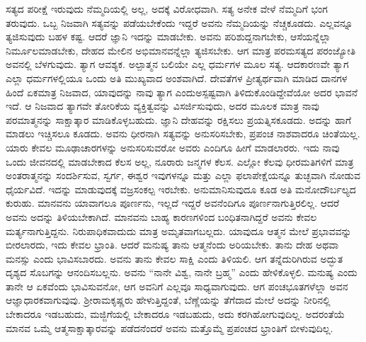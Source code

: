 ಸತ್ಯದ ಪರೀಕ್ಷೆ ಇರುವುದು ನೆಮ್ಮದಿಯಲ್ಲಿ ಅಲ್ಲ, ಅದಕ್ಕೆ ವಿರೋಧವಾಗಿ. ಸತ್ಯ ಅನೇಕ ವೇಳೆ ನೆಮ್ಮದಿಗೆ ಭಂಗ ತರುವುದು. ಒಬ್ಬ ನಿಜವಾಗಿ ಸತ್ಯವನ್ನು ಪಡೆಯಬೇಕೆಂದು ಇದ್ದರೆ ಅವನು ನೆಮ್ಮದಿಯನ್ನು ನೆಚ್ಚಕೂಡದು. ಎಲ್ಲವನ್ನೂ ತ್ಯಜಿಸುವುದು ಬಹಳ ಕಷ್ಟ. ಆದರೆ ಜ್ಞಾನಿ ಇದನ್ನು ಮಾಡಬೇಕು. ಅವನು ಪರಿಶುದ್ದನಾಗಬೇಕು, ಆಸೆಯನ್ನೆಲ್ಲಾ ನಿರ್ಮೂಲಮಾಡಬೇಕು, ದೇಹದ ಮೇಲಿನ ಅಭಿಮಾನವನ್ನೆಲ್ಲಾ ತ್ಯಜಿಸಬೇಕು. ಆಗ ಮಾತ್ರ ಪರಮಸತ್ಯದ ಪರಂಜ್ಯೋತಿ ಅವನಲ್ಲಿ ಬೆಳಗುವುದು. ತ್ಯಾಗ ಆವಶ್ಯಕ. ಅಲ್ಪಾತ್ಮನ ಬಲಿಯೇ ಎಲ್ಲ ಧರ್ಮಗಳ ಮೂಲ ಸತ್ಯ. ಆದಕಾರಣವೇ ತ್ಯಾಗ ಎಲ್ಲಾ ಧರ್ಮಗಳಲ್ಲಿಯೂ ಒಂದು ಅತಿ ಮುಖ್ಯವಾದ ಅಂಶವಾಗಿದೆ. ದೇವತೆಗಳ ಪ್ರೀತ್ಯರ್ಥವಾಗಿ ಮಾಡಿದ ದಾನಗಳ ಹಿಂದೆ ಏಕಮಾತ್ರ ನಿಜವಾದ, ಯಾವುದನ್ನು ನಾವು ತ್ಯಾಗ ಎಂದು\break ಅಸ್ಪಷ್ಟವಾಗಿ ತಿಳಿದುಕೊಂಡಿದ್ದೇವೆಯೋ ಅದರ ಭಾವನೆ ಇದೆ. ಆ ನಿಜವಾದ ತ್ಯಾಗವೇ ತೋರಿಕೆಯ ವ್ಯಕ್ತಿತ್ವವನ್ನು ವಿಸರ್ಜಿಸುವುದು, ಅದರ ಮೂಲಕ ಮಾತ್ರ ನಾವು ಪರಮಾತ್ಮನನ್ನು ಸಾಕ್ಷಾತ್ಕಾರ ಮಾಡಿಕೊಳ್ಳಬಹುದು. ಜ್ಞಾನಿ ದೇಹವನ್ನು ರಕ್ಷಿಸಲು ಪ್ರಯತ್ನಿಸಕೂಡದು. ಅದನ್ನು ಹಾಗೆ ಮಾಡಲು ಇಚ್ಚಿಸಲೂ ಕೂಡದು. ಅವನು ಧೀರನಾಗಿ ಸತ್ಯವನ್ನು ಅನುಸರಿಸಬೇಕು, ಪ್ರಪಂಚ ನಾಶವಾದರೂ ಚಿಂತೆಯಿಲ್ಲ. ಯಾರು ಕೇವಲ ಮೂಢಾಚಾರಗಳನ್ನು ಅನುಸರಿಸುವರೋ ಅವರು ಎಂದಿಗೂ ಹೀಗೆ ಮಾಡಲಾರರು. ಇದು ನಾವು ಒಂದು ಜೀವನದಲ್ಲಿ ಮಾಡಬೇಕಾದ ಕೆಲಸ ಅಲ್ಲ, ನೂರಾರು ಜನ್ಮಗಳ ಕೆಲಸ. ಎಲ್ಲೋ ಕೆಲವು ಧೀರಮತಿಗಳಿಗೆ ಮಾತ್ರ ಅಂತರಾತ್ಮನನ್ನು ಸಂದರ್ಶಿಸುವ, ಸ್ವರ್ಗ, ಈಶ್ವರ ಇವುಗಳನ್ನೂ ಮತ್ತು ಎಲ್ಲಾ ಫಲಾಪೇಕ್ಷೆಯನ್ನೂ ತುಚ್ಛವಾಗಿ ನೋಡುವ ಧೈರ್ಯವಿದೆ. ಇದನ್ನು ಮಾಡುವುದಕ್ಕೆ ವಜ್ರಸಂಕಲ್ಪ ಇರಬೇಕು. ಅನುಮಾನಿಸುವುದೂ ಕೂಡ ಅತಿ ಮನೋದೌರ್ಬಲ್ಯದ ಕುರುಹು. ಮಾನವನು ಯಾವಾಗಲೂ ಪೂರ್ಣನು, ಇಲ್ಲದೆ ಇದ್ದರೆ ಅವನೆಂದಿಗೂ ಪೂರ್ಣನಾಗುತ್ತಿರಲಿಲ್ಲ. ಆದರೆ ಅವನು ಅದನ್ನು ತಿಳಿಯಬೇಕಾಗಿದೆ. ಮಾನವನು ಬಾಹ್ಯ ಕಾರಣಗಳಿಂದ ಬಂಧಿತನಾಗಿದ್ದರೆ ಅವನು ಕೇವಲ ಮರ್ತ್ಯನಾಗುತ್ತಿದ್ದನು. ನಿರುಪಾಧಿಕವಾದುದು ಮಾತ್ರ ಅಮೃತವಾಗಬಲ್ಲದು. ಯಾವುದೂ ಆತ್ಮನ ಮೇಲೆ ಪ್ರಭಾವವನ್ನು ಬೀರಲಾರದು, ಇದು ಕೇವಲ ಭ್ರಾಂತಿ. ಆದರೆ ಮನುಷ್ಯ ತಾನು ಆತ್ಮನೆಂದು ಅರಿಯಬೇಕು. ತಾನು ದೇಹ ಅಥವಾ ಮನಸ್ಸು ಎಂದು ಭಾವಿಸಬಾರದು. ಅವನು ತಾನು ಕೇವಲ ಸಾಕ್ಷಿ ಎಂದು ತಿಳಿಯಲಿ. ಆಗ ತನ್ನೆದುರಿಗಿರುವ ಅದ್ಭುತ ದೃಶ್ಯದ ಸೊಬಗನ್ನು ಆನಂದಿಸಬಲ್ಲನು. ಅವನು “ನಾನೇ ವಿಶ್ವ, ನಾನೇ ಬ್ರಹ್ಮ'' ಎಂದು ಹೇಳಿಕೊಳ್ಳಲಿ. ಮನುಷ್ಯ ಎಂದು ತಾನೇ ಆ ಏಕವೆಂದು ಭಾವಿಸುವನೋ, ಆಗ ಅವನಿಗೆ ಎಲ್ಲವೂ ಸಾಧ್ಯವಾಗುವುದು. ಆಗ ಪಂಚಭೂತಗಳೆಲ್ಲಾ ಅವನ ಆಜ್ಞಾಧಾರಕವಾಗುವುವು. ಶ‍್ರೀರಾಮಕೃಷ್ಣರು ಹೇಳುತ್ತಿದ್ದಂತೆ, ಬೆಣ್ಣೆಯನ್ನು ತೆಗೆದಾದ ಮೇಲೆ ಅದನ್ನು ನೀರಿನಲ್ಲಿ ಬೇಕಾದರೂ ಇಡಬಹುದು, ಮಜ್ಜಿಗೆಯಲ್ಲಿ ಬೇಕಾದರೂ ಇಡಬಹುದು, ಅದು ಕರಗಿಹೋಗುವುದಿಲ್ಲ. ಅದರಂತೆಯೆ ಮಾನವ ಒಮ್ಮೆ ಆತ್ಮಸಾಕ್ಷಾತ್ಕಾರವನ್ನು ಪಡೆದನೆಂದರೆ ಅವನು ಮತ್ತೊಮ್ಮೆ ಪ್ರಪಂಚದ ಭ್ರಾಂತಿಗೆ ಬೀಳುವುದಿಲ್ಲ.

